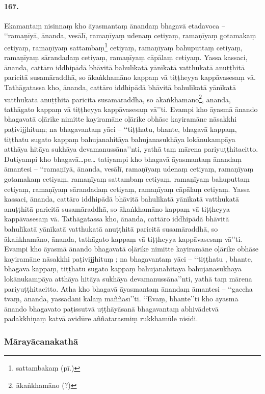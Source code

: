 \paragraph{167.} Ekamantaṃ nisinnaṃ kho āyasmantaṃ ānandaṃ bhagavā etadavoca – ‘‘ramaṇīyā, ānanda, vesālī, ramaṇīyaṃ udenaṃ cetiyaṃ, ramaṇīyaṃ gotamakaṃ cetiyaṃ, ramaṇīyaṃ sattambaṃ\footnote{sattambakaṃ (pī.)} cetiyaṃ, ramaṇīyaṃ bahuputtaṃ cetiyaṃ, ramaṇīyaṃ sārandadaṃ cetiyaṃ, ramaṇīyaṃ cāpālaṃ cetiyaṃ. Yassa kassaci, ānanda, cattāro iddhipādā bhāvitā bahulīkatā yānīkatā vatthukatā anuṭṭhitā paricitā susamāraddhā, so ākaṅkhamāno kappaṃ vā tiṭṭheyya kappāvasesaṃ vā. Tathāgatassa kho, ānanda, cattāro iddhipādā bhāvitā bahulīkatā yānīkatā vatthukatā anuṭṭhitā paricitā susamāraddhā, so ākaṅkhamāno\footnote{ākaṅkhamāno (?)}, ānanda, tathāgato kappaṃ vā tiṭṭheyya kappāvasesaṃ vā’’ti. Evampi kho āyasmā ānando bhagavatā oḷārike nimitte kayiramāne oḷārike obhāse kayiramāne nāsakkhi paṭivijjhituṃ; na bhagavantaṃ yāci – ‘‘tiṭṭhatu, bhante, bhagavā kappaṃ, tiṭṭhatu sugato kappaṃ bahujanahitāya bahujanasukhāya lokānukampāya atthāya hitāya sukhāya devamanussāna’’nti, yathā taṃ mārena pariyuṭṭhitacitto. Dutiyampi kho bhagavā…pe… tatiyampi kho bhagavā āyasmantaṃ ānandaṃ āmantesi – ‘‘ramaṇīyā, ānanda, vesālī, ramaṇīyaṃ udenaṃ cetiyaṃ, ramaṇīyaṃ gotamakaṃ cetiyaṃ, ramaṇīyaṃ sattambaṃ cetiyaṃ, ramaṇīyaṃ bahuputtaṃ cetiyaṃ, ramaṇīyaṃ sārandadaṃ cetiyaṃ, ramaṇīyaṃ cāpālaṃ cetiyaṃ. Yassa kassaci, ānanda, cattāro iddhipādā bhāvitā bahulīkatā yānīkatā vatthukatā anuṭṭhitā paricitā susamāraddhā, so ākaṅkhamāno kappaṃ vā tiṭṭheyya kappāvasesaṃ vā. Tathāgatassa kho, ānanda, cattāro iddhipādā bhāvitā bahulīkatā yānīkatā vatthukatā anuṭṭhitā paricitā susamāraddhā, so ākaṅkhamāno, ānanda, tathāgato kappaṃ vā tiṭṭheyya kappāvasesaṃ vā’’ti. Evampi kho āyasmā ānando bhagavatā oḷārike nimitte kayiramāne oḷārike obhāse kayiramāne nāsakkhi paṭivijjhituṃ ; na bhagavantaṃ yāci – ‘‘tiṭṭhatu , bhante, bhagavā kappaṃ, tiṭṭhatu sugato kappaṃ bahujanahitāya bahujanasukhāya lokānukampāya atthāya hitāya sukhāya devamanussāna’’nti, yathā taṃ mārena pariyuṭṭhitacitto. Atha kho bhagavā āyasmantaṃ ānandaṃ āmantesi – ‘‘gaccha tvaṃ, ānanda, yassadāni kālaṃ maññasī’’ti. ‘‘Evaṃ, bhante’’ti kho āyasmā ānando bhagavato paṭissutvā uṭṭhāyāsanā bhagavantaṃ abhivādetvā padakkhiṇaṃ katvā avidūre aññatarasmiṃ rukkhamūle nisīdi.

\subsubsection{Mārayācanakathā}


